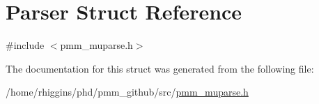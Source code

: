 \hypertarget{structParser}{\section{Parser Struct Reference}
\label{structParser}
}


{\ttfamily \#include $<$pmm\-\_\-muparse.\-h$>$}



The documentation for this struct was generated from the following file\-:\begin{DoxyCompactItemize}
\item 
/home/rhiggins/phd/pmm\-\_\-github/src/\hyperlink{pmm__muparse_8h}{pmm\-\_\-muparse.\-h}\end{DoxyCompactItemize}
